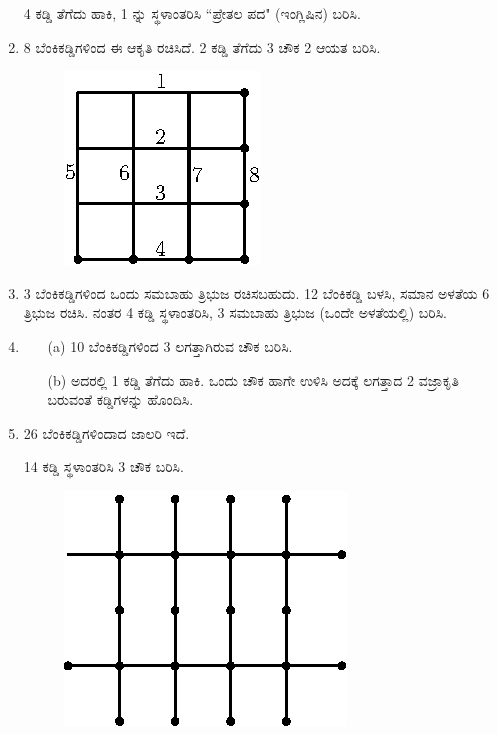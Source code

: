 \begin{enumerate}
4 ಕಡ್ಡಿ ತೆಗೆದು ಹಾಕಿ, 1 ನ್ನು ಸ್ಥಳಾಂತರಿಸಿ ``ಪ್ರೇತಲ ಪದ" (ಇಂಗ್ಲಿಷಿನ) ಬರಿಸಿ.  

\item 8 ಬೆಂಕಿಕಡ್ಡಿಗಳಿಂದ ಈ ಆಕೃತಿ ರಚಿಸಿದೆ. 2 ಕಡ್ಡಿ ತೆಗೆದು 3 ಚೌಕ 2 ಆಯತ ಬರಿಸಿ.

\begin{figure}[!h]
\centering
\includegraphics{images/chap5/q9.eps}
\end{figure}

\item  3 ಬೆಂಕಿಕಡ್ಡಿಗಳಿಂದ ಒಂದು ಸಮಬಾಹು ತ್ರಿಭುಜ ರಚಿಸಬಹುದು. 12 ಬೆಂಕಿಕಡ್ಡಿ  ಬಳಸಿ, ಸಮಾನ ಅಳತೆಯ 6 ತ್ರಿಭುಜ ರಚಿಸಿ. ನಂತರ 4 ಕಡ್ಡಿ ಸ್ಥಳಾಂತರಿಸಿ, 3 ಸಮಬಾಹು ತ್ರಿಭುಜ (ಒಂದೇ ಅಳತೆಯಲ್ಲಿ) ಬರಿಸಿ.

\item 
\begin{itemize}
\item[(a)] 10 ಬೆಂಕಿಕಡ್ಡಿಗಳಿಂದ 3 ಲಗತ್ತಾಗಿರುವ ಚೌಕ ಬರಿಸಿ.
\item[(b)] ಅದರಲ್ಲಿ 1 ಕಡ್ಡಿ ತೆಗೆದು ಹಾಕಿ. ಒಂದು ಚೌಕ ಹಾಗೇ ಉಳಿಸಿ ಅದಕ್ಕೆ ಲಗತ್ತಾದ 2 ವಜ್ರಾಕೃತಿ ಬರುವಂತೆ ಕಡ್ಡಿಗಳನ್ನು ಹೊಂದಿಸಿ.  
\end{itemize}

\item 26 ಬೆಂಕಿಕಡ್ಡಿಗಳಿಂದಾದ ಜಾಲರಿ ಇದೆ. 

14 ಕಡ್ಡಿ ಸ್ಥಳಾಂತರಿಸಿ 3 ಚೌಕ ಬರಿಸಿ. 

\begin{figure}[!h]
\centering
\includegraphics{images/chap5/q12.eps}
\end{figure}


\end{enumerate}
